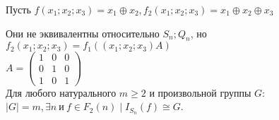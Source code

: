 \examplei
Пусть $f(x_1;x_2;x_3) = x_1\oplus x_2, f_2(x_1;x_2;x_3)=x_1 \oplus x_2 \oplus x_3$

Они не эквивалентны относительно $S_n;Q_n$, но
$f_2(x_1;x_2;x_3)=f_1((x_1;x_2;x_3)A)$\\

$A=
\begin{pmatrix}
  1 & 0 & 0\\
  0 & 1 & 0\\
  1 & 0 & 1
\end{pmatrix}$\\

\thr
Для любого натурального $ m \geqslant 2$ и произвольной группы $G$:
$|G|=m, \exists n\  \text{и}\  f\in F_2(n) \mid I_{S_n}(f) \cong G$.